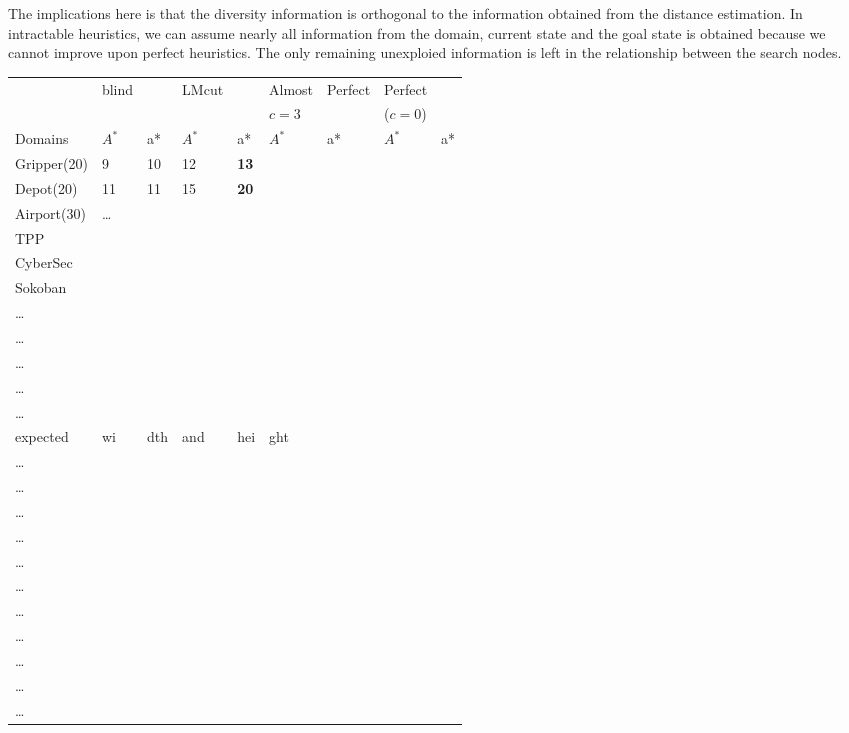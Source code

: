 The implications here is that the diversity information is orthogonal to the information obtained from the distance estimation. In intractable heuristics, we can assume nearly all information from the domain, current state and the goal state is obtained because we cannot improve upon perfect heuristics. The only remaining unexploied information is left in the relationship between the search nodes.
{ \setlength{\tabcolsep}{0.1em}
\begin{table}[htb]
\centering {}
\begin{tabular}{l|ll|ll||ll|ll|}
 & blind &  & LMcut &  & Almost & Perfect & Perfect & \\
 &  &  &  &  & $c=3$ &  & ($c=0$) & \\
Domains & $A^*$ & \*a* & $A^*$ & \*a* & $A^*$ & \*a* & $A^*$ & \*a* \\
\hline
Gripper(20) & 9 & 10 & 12 & \textbf{13} &  &  &  & \\
Depot(20) & 11 & 11 & 15 & \textbf{20} &  &  &  & \\
Airport(30) & \ldots{} &  &  &  &  &  &  & \\
TPP &  &  &  &  &  &  &  & \\
CyberSec &  &  &  &  &  &  &  & \\
Sokoban &  &  &  &  &  &  &  & \\
\ldots{} &  &  &  &  &  &  &  & \\
\ldots{} &  &  &  &  &  &  &  & \\
\ldots{} &  &  &  &  &  &  &  & \\
\ldots{} &  &  &  &  &  &  &  & \\
\ldots{} &  &  &  &  &  &  &  & \\
expected & wi & dth & and & hei & ght &  &  & \\
\ldots{} &  &  &  &  &  &  &  & \\
\ldots{} &  &  &  &  &  &  &  & \\
\ldots{} &  &  &  &  &  &  &  & \\
\ldots{} &  &  &  &  &  &  &  & \\
\ldots{} &  &  &  &  &  &  &  & \\
\ldots{} &  &  &  &  &  &  &  & \\
\ldots{} &  &  &  &  &  &  &  & \\
\ldots{} &  &  &  &  &  &  &  & \\
\ldots{} &  &  &  &  &  &  &  & \\
\ldots{} &  &  &  &  &  &  &  & \\
\ldots{} &  &  &  &  &  &  &  & \\

\end{tabular}
\end{table}}
